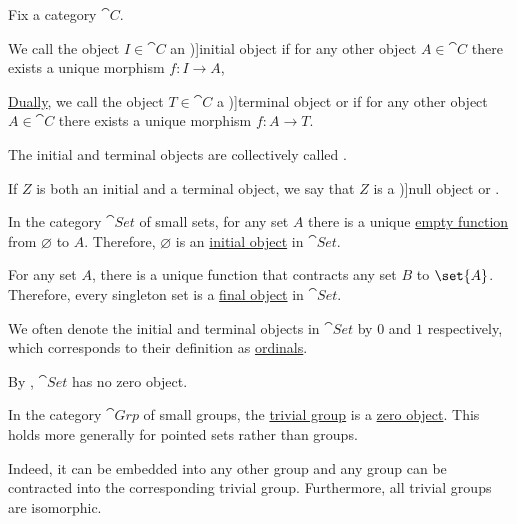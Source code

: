 \begin{definition}\label{def:universal_objects}
  Fix a category \( \cat{C} \).

  \begin{thmenum}
     We call the object \( I \in \cat{C} \) an \term[ru=начальный объект (\cite[80]{ЦаленкоШульгейфер1974Категории})]{initial object} if for any other object \( A \in \cat{C} \) there exists a unique morphism \( f: I \to A \),

     \hyperref[thm:categorical_principle_of_duality]{Dually}, we call the object \( T \in \cat{C} \) a \term[ru=конечный объект (\cite[80]{ЦаленкоШульгейфер1974Категории})]{terminal object} or  if for any other object \( A \in \cat{C} \) there exists a unique morphism \( f: A \to T \).

    The initial and terminal objects are collectively called .

     If \( Z \) is both an initial and a terminal object, we say that \( Z \) is a \term[ru=нулевой объект (\cite[80]{ЦаленкоШульгейфер1974Категории})]{null object} or .
  \end{thmenum}
\end{definition}

\begin{example}\label{ex:def:universal_objects}
  \begin{thmenum}
     In the category \hyperref[def:category_of_small_sets]{\( \cat{Set} \)} of small sets, for any set \( A \) there is a unique \hyperref[def:set_valued_map/empty]{empty function} from \( \varnothing \) to \( A \). Therefore, \( \varnothing \) is an \hyperref[def:universal_objects/initial]{initial object} in \( \cat{Set} \).

    For any set \( A \), there is a unique function that contracts any set \( B \) to \( \set{ A } \). Therefore, every singleton set is a \hyperref[def:universal_objects/terminal]{final object} in \( \cat{Set} \).

    We often denote the initial and terminal objects in \( \cat{Set} \) by \( 0 \) and \( 1 \) respectively, which corresponds to their definition as \hyperref[def:ordinal]{ordinals}.

    By , \( \cat{Set} \) has no zero object.

     In the category \hyperref[def:group/category]{\( \cat{Grp} \)} of small groups, the \hyperref[def:group/trivial]{trivial group} is a \hyperref[def:universal_objects/zero]{zero object}. This holds more generally for pointed sets rather than groups.

    Indeed, it can be embedded into any other group and any group can be contracted into the corresponding trivial group. Furthermore, all trivial groups are isomorphic.
  \end{thmenum}
\end{example}

